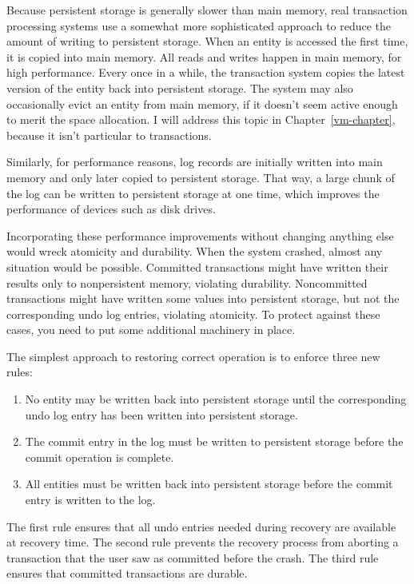 Because persistent storage is generally slower than main memory, real
transaction processing systems use a somewhat more sophisticated
approach to reduce the amount of writing to persistent storage.  When
an entity is accessed the first time, it is copied into main memory.
All reads and writes happen in main memory, for high performance.
Every once in a while, the transaction system copies the latest
version of the entity back into persistent storage.  The system may
also occasionally evict an entity from main memory, if it doesn't seem
active enough to merit the space allocation.  I will address this
topic in Chapter~\ref{vm-chapter}, because it isn't particular to transactions.

Similarly, for performance reasons, log records are initially written
into main memory and only later copied to persistent storage.  That
way, a large chunk of the log can be written to persistent storage at
one time, which improves the performance of devices such as disk drives.

Incorporating these performance improvements without changing anything
else would wreck atomicity and durability.  When the system crashed,
almost any situation would be possible.  Committed transactions might
have written their results only to nonpersistent memory, violating
durability.  Noncommitted transactions might have written some values
into persistent storage, but not the corresponding undo log entries,
violating atomicity.  To protect against these cases, you need to put
some additional machinery in place.

The simplest approach to restoring correct operation is to enforce three
new rules:
\begin{enumerate}
\item
No entity may be written back into persistent storage until the
corresponding undo log entry has been written into persistent storage.
\item
The commit entry in the log must be written to persistent storage
before the commit operation is complete.
\item
All entities must be written back into persistent storage before the
commit entry is written to the log.
\end{enumerate}
The first rule ensures that all undo entries needed during recovery
are available at recovery time.  The second rule prevents the recovery
process from aborting a transaction that the user saw as committed
before the crash.  The third rule ensures that committed transactions
are durable.

